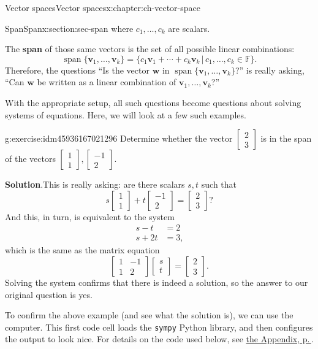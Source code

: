\documentclass[oneside,10pt,]{book}
\newcommand{\blocktitlefont}{\relax}
\newcommand{\mono}[1]{\texttt{#1}}
\newcommand{\terminology}[1]{\textbf{#1}}
\numberwithin{equation}{section}
\newcommand{\spn}{\operatorname{span}}
\newcommand{\bbm}{\begin{bmatrix}}
\newcommand{\ebm}{\end{bmatrix}}
\newcommand{\vv}{\mathbf{v}}
\newcommand{\ww}{\mathbf{w}}
\newcommand{\amp}{&}
\begin{document}
\begin{chapterptx}{Vector spaces}{}{Vector spaces}{}{}{x:chapter:ch-vector-space}
\begin{sectionptx}{Span}{}{Span}{}{}{x:section:sec-span}
where \(c_1,\ldots, c_k\) are scalars.%
\par
The \terminology{span} of those same vectors is the set of all possible linear combinations:%
\begin{equation*}
\spn\{\vv_1,\ldots, \vv_k\} = \{c_1\vv_1+ \cdots + c_k\vv_k \,|\, c_1,\ldots, c_k \in \mathbb{F}\}.
\end{equation*}
Therefore, the questions ``Is the vector \(\ww\) in \(\spn\{\vv_1,\ldots, \vv_k\}\)?'' is really asking, ``Can \(\ww\) be written as a linear combination of \(\vv_1,\ldots, \vv_k\)?''%
\par
With the appropriate setup, all such questions become questions about solving systems of equations. Here, we will look at a few such examples.%
\begin{inlineexercise}{}{g:exercise:idm45936167021296}%
Determine whether the vector \(\bbm 2\\3\ebm\) is in the span of the vectors \(\bbm 1\\1\ebm,\bbm -1\\2\ebm\).%
\par\smallskip%
\noindent\textbf{\blocktitlefont Solution}.\label{g:solution:idm45936167019648}{}\hypertarget{g:solution:idm45936167019648}{}\quad{}This is really asking: are there scalars \(s,t\) such that%
\begin{equation*}
s\bbm 1\\1\ebm + t\bbm -1\\2\ebm = \bbm 2\\3\ebm\text{?}
\end{equation*}
And this, in turn, is equivalent to the system%
\begin{align*}
s -t \amp=2 \\
s+2t \amp=3 \text{,}
\end{align*}
which is the same as the matrix equation%
\begin{equation*}
\bbm 1\amp -1\\1\amp 2\ebm\bbm s\\t\ebm = \bbm 2\\3\ebm.
\end{equation*}
Solving the system confirms that there is indeed a solution, so the answer to our original question is yes.%
\par
To confirm the above example (and see what the solution is), we can use the computer. This first code cell loads the \mono{sympy} Python library, and then configures the output to look nice. For details on the code used below, see \hyperref[x:appendix:ch-computation]{the Appendix, p.\,\pageref{x:appendix:ch-computation}}.%

\end{inlineexercise}
\end{sectionptx}
\end{chapterptx}
\end{document}

